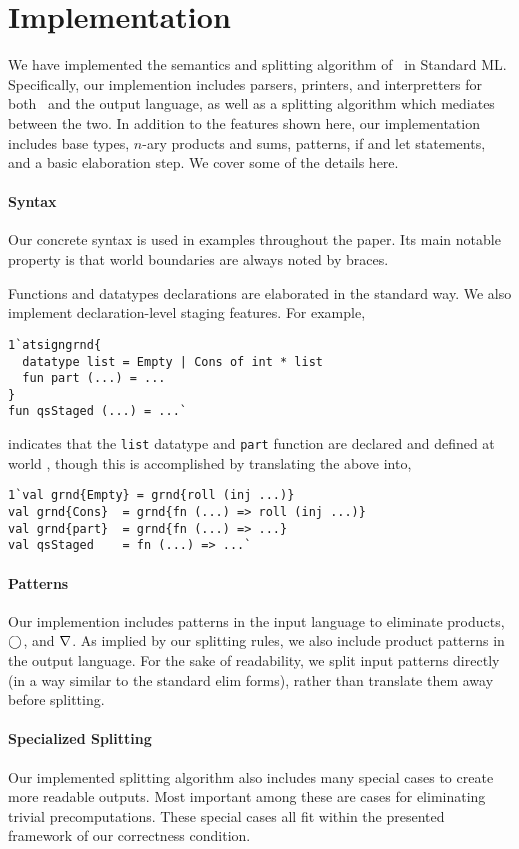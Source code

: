 
\section {Implementation}
\label{sec:implementation}

\begin{abstrsyn}
We have implemented the semantics and splitting algorithm of \lang\ in Standard ML.
Specifically, our implemention includes parsers, printers, and interpretters for both \lang\ 
and the output language, as well as a splitting algorithm which mediates between the two.
In addition to the features shown here, our implementation includes base types, 
$n$-ary products and sums, patterns, if and let statements, and a basic elaboration step.
We cover some of the details here.

\paragraph {Syntax}
Our concrete syntax is used in examples throughout the paper.
Its main notable property is that world boundaries are always noted by braces.

Functions and datatypes declarations are elaborated in the standard way.
We also implement declaration-level staging features.  For example,
\begin{lstlisting}
1`atsigngrnd{
  datatype list = Empty | Cons of int * list
  fun part (...) = ...
}
fun qsStaged (...) = ...`
\end{lstlisting}
indicates that the \texttt{list} datatype and \texttt{part} function
are declared and defined at world \bbonep, though this is accomplished by 
translating the above into,
\begin{lstlisting}
1`val grnd{Empty} = grnd{roll (inj ...)}
val grnd{Cons}  = grnd{fn (...) => roll (inj ...)}
val grnd{part}  = grnd{fn (...) => ...}
val qsStaged    = fn (...) => ...`
\end{lstlisting}

\paragraph {Patterns}
Our implemention includes patterns in the input language to eliminate products, $\bigcirc$, and $\nabla$.
As implied by our splitting rules, we also include product patterns in the output language.
For the sake of readability, we split input patterns directly (in a way similar to the standard elim forms), 
rather than translate them away before splitting.

\paragraph {Specialized Splitting} 
Our implemented splitting algorithm also includes many special cases to create more readable outputs.
Most important among these are cases for eliminating trivial precomputations.
These special cases all fit within the presented framework of our correctness condition.

\end{abstrsyn}